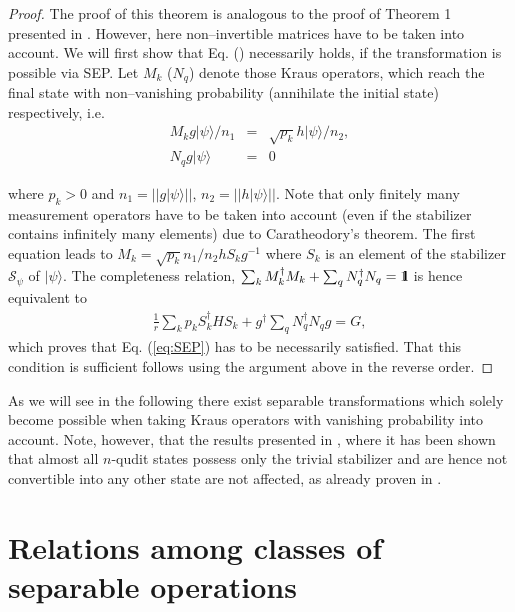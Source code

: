 \documentclass[superscriptaddress,twocolumn]{revtex4}\usepackage[utf8]{inputenc}
\newcommand{\one}{\mbox{$1 \hspace{-1.0mm}  {\bf l}$}}
\newcommand{\ket}[1]{|#1\rangle}
\newcommand{\bea}{\begin{eqnarray}}
\newcommand{\eea}{\end{eqnarray}}
\begin{document}
\begin{proof}

The proof of this theorem is analogous to the proof of Theorem 1 presented in \cite{GoWa11}. However, here non--invertible matrices have to be taken into account. We will first show that Eq. (\theequation) necessarily holds, if the transformation is possible via SEP.
Let $M_k$ ($N_q$) denote those Kraus operators, which reach the final state with non--vanishing probability (annihilate the initial state) respectively, i.e.
\bea M_k g\ket{\psi}/n_1&=&\sqrt{p_k} h\ket{\psi}/n_2,\\
N_q g\ket{\psi}&=&0 \eea

where $p_k > 0$ and $n_1=||g\ket{\psi}||$, $n_2=||h\ket{\psi}||$. Note that only finitely many measurement operators have to be taken into account (even if the stabilizer contains infinitely many elements) due to Caratheodory's theorem.
The first equation leads to $M_k=\sqrt{p_k} n_1/n_2 h S_k g^{-1}$ where $S_k$ is an element of the stabilizer $\mathcal{S}_\psi$ of $\ket{\psi}$. The completeness relation, $\sum_k M_k^\dagger M_k +\sum_q N_q^\dagger N_q=\one$ is hence equivalent to
\bea
\frac{1}{r} \sum_k p_k S_k^\dagger H S_k + g^\dagger \sum_q N_q^\dagger N_q g=G, \eea which proves that Eq. (\ref{eq:SEP}) has to be necessarily satisfied. That this condition is sufficient follows using the argument above in the reverse order.
\end{proof}

As we will see in the following there exist separable transformations which solely become possible when taking Kraus operators with vanishing probability into account. Note, however, that the results presented in \cite{GoKr17,SaGo18}, where it has been shown that almost all $n$-qudit states possess only the trivial stabilizer and are hence not convertible into any other state are not affected, as already proven in \cite{GoKr17}.


\section{Relations among classes of separable operations}
\end{document}
